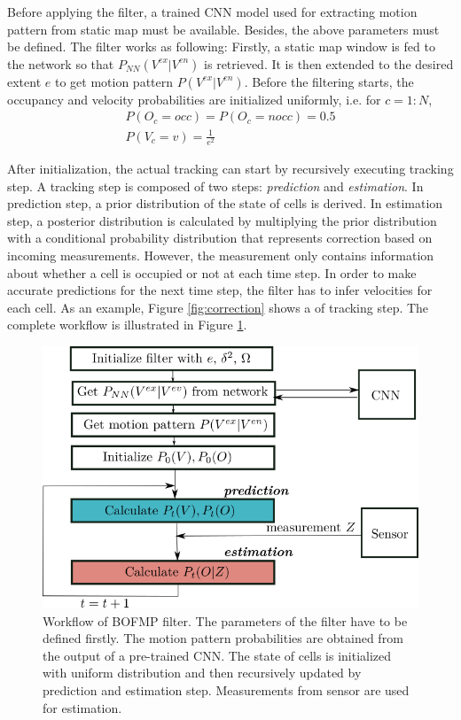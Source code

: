 Before applying the filter, a trained CNN model used for extracting motion pattern from static map must be available. Besides, the above parameters must be defined. The filter works as following: Firstly, a static map window is fed to the network so that $P_{NN}(V^{ex}|V^{en})$ is retrieved. It is then extended to the desired extent $e$ to get motion pattern $P(V^{ex}|V^{en})$. Before the filtering starts, the occupancy and velocity probabilities are initialized uniformly, i.e. for $c=1:N$,
\begin{gather}
P(O_c = occ) = P(O_c = nocc)=0.5 \label{eq:init_O}\\ 
P(V_c=v) = \frac{1}{e^2} \label{eq:init_V}
\end{gather}

 After initialization, the actual tracking can start by recursively executing tracking step. A tracking step is composed of two steps: \textit{prediction} and \textit{estimation}. In prediction step, a prior distribution of the state of cells is derived. In estimation step, a posterior distribution is calculated by multiplying the prior distribution with a conditional probability distribution that represents correction based on incoming measurements. However, the measurement only contains information about whether a cell is occupied or not at each time step. In order to make accurate predictions for the next time step, the filter has to infer velocities for each cell. As an example, Figure \ref{fig:correction} shows a of tracking step. The complete workflow is illustrated in Figure \ref{fig:fitering_workflow}.

 \newpage

\begin{figure}[H]
  \centering
    \includegraphics[width=.7\textwidth]{figures/filtering_workflow.png}
    \caption[Workflow of BOFMP filter.]{Workflow of BOFMP filter. The parameters of the filter have to be defined firstly. The motion pattern probabilities are obtained from the output of a pre-trained CNN. The state of cells is initialized with uniform distribution and then recursively updated by prediction and estimation step. Measurements from sensor are used for estimation.}
    \label{fig:fitering_workflow}
\end{figure}

